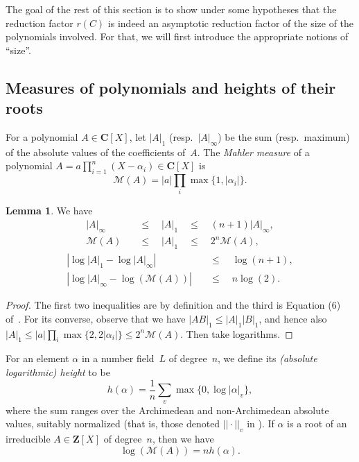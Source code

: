 \documentclass{amsart}
\newcommand{\CC}{\mathbf{C}}
\newcommand{\ZZ}{\mathbf{Z}}
\newcommand{\curve}{C}
\numberwithin{equation}{section}
\theoremstyle{definition}
\newtheorem{lemma}[equation]{Lemma}
\begin{document}
The goal of the rest of this section is to show under some hypotheses
that the reduction factor $r(\curve)$ is indeed an asymptotic reduction
factor of the size of the polynomials involved.
For that, we will first introduce
the appropriate notions of ``size''.

\subsection{Measures of polynomials and heights of their roots}
For a polynomial $A\in \CC[X]$,
let $|A|_1$ (resp.~$|A|_\infty$) be the sum (resp.~maximum) of the
absolute values of the coefficients of~$A$.
The \emph{Mahler measure} of a
polynomial $A = a\prod_{i=1}^{n} (X-\alpha_i)\in\CC[X]$ is
$$\mathcal{M}(A) = |a| \prod_{i} \max\{1,|\alpha_i|\}.$$
\begin{lemma}\label{lem:polymeasures}
	We have
\begin{align*}
	|A|_\infty \quad &\leq \quad |A|_1 \quad \leq \quad (n+1)|A|_\infty,\\
	\mathcal{M}(A)\quad &\leq \quad |A|_1 \quad \leq \quad 2^n \mathcal{M}(A),
\end{align*}
\begin{align*}
	\left|\log|A|_1 - \log|A|_\infty \right| &\quad \leq\quad  \log(n+1),\\
	\left|\log|A|_\infty - \log(\mathcal{M}(A)) \right| &\quad \leq\quad  n\log(2).
\end{align*}
\end{lemma}
\begin{proof}
The first two inequalities are by definition and the third is
Equation (6) of~\cite{mahler1960}.
For its converse, observe that we have
$|AB|_1 \leq |A|_1|B|_1$, and hence also
$	|A|_1 \leq |a|  \prod_i \max\{2, 2|\alpha_i|\} \leq 2^n\mathcal{M}(A).$
Then take logarithms.
\end{proof}

For an element $\alpha$ in a number field~$L$ of degree~$n$,
we define its \emph{(absolute logarithmic) height} to be
$$h(\alpha) = \frac{1}{n}\sum_{v} \max\{0,\log|\alpha|_v\},$$
where the sum ranges over the Archimedean
and non-Archimedean absolute values, suitably
normalized (that is, those denoted $||\cdot||_v$
in \cite[\S B.1]{hindry-silverman}). If $\alpha$ is a root of an irreducible $A\in\ZZ[X]$ of degree~$n$,
then we have
\begin{equation}\label{eq:mahler}
	\log(\mathcal{M}(A)) = n h(\alpha).
\end{equation}
\end{document}
